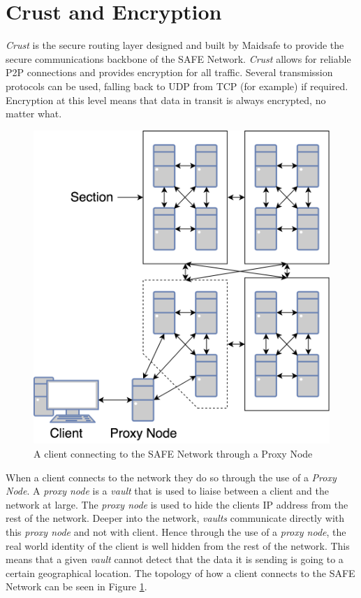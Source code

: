 \section{Crust and Encryption}

\textit{Crust} is the secure routing layer designed and built by Maidsafe to provide the secure communications backbone of the SAFE Network. \textit{Crust} allows for reliable P2P connections and provides encryption for all traffic. Several transmission protocols can be used, falling back to UDP from TCP (for example) if required. Encryption at this level means that data in transit is always encrypted, no matter what.

\begin{figure}
	\begin{center}
		\includegraphics[scale=0.3]{diagrams/safe-network-connection}
		\caption{A client connecting to the SAFE Network through a Proxy Node}
		\label{fig:proxy-connection}
	\end{center}
\end{figure}

When a client connects to the network they do so through the use of a \textit{Proxy Node}. A \textit{proxy node} is a \textit{vault} that is used to liaise between a client and the network at large. The \textit{proxy node} is used to hide the clients IP address from the rest of the network. Deeper into the network, \textit{vaults} communicate directly with this \textit{proxy node} and not with client. Hence through the use of a \textit{proxy node}, the real world identity of the client is well hidden from the rest of the network. This means that a given \textit{vault} cannot detect that the data it is sending is going to a certain geographical location. The topology of how a client connects to the SAFE Network can be seen in Figure \ref{fig:proxy-connection}.

